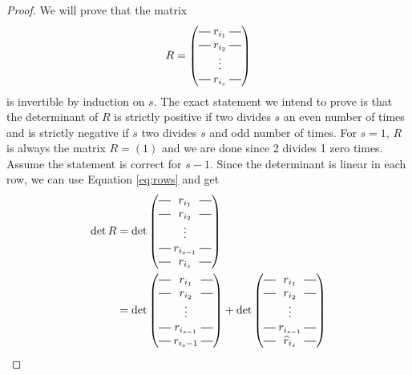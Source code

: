 \begin{proof}
  We will prove that the matrix
  \[ R = 
  \begin{pmatrix}
    \matrow{r_{i_1}} \\
    \matrow{r_{i_2}} \\
    & \hspace{-0.75em} \vdots & \\
    \matrow{r_{i_s}}
  \end{pmatrix}
  \]
  is invertible by induction on $s$. The exact statement we intend to
  prove is that the determinant of $R$ is strictly positive if two
  divides $s$ an even number of times and is strictly negative if $s$
  two divides $s$ and odd number of times.
  For $s = 1$, $R$ is always the matrix $R = \left( 1 \right)$ and we
  are done since 2 divides 1 zero times.
  Assume the statement is correct for $s-1$. Since the determinant is
  linear in each row, we can use Equation \ref{eq:rows} and get
  \begin{align*}
    \det{R} &= 
              \det\begin{pmatrix}
                \matrow{r_{i_1}} \\
                \matrow{r_{i_2}} \\
                & \hspace{-0.75em} \vdots & \\
                \matrow{r_{i_{s-1}}} \\
                \matrow{r_{i_s}}
              \end{pmatrix} \\
            &= 
              \det\begin{pmatrix}
                \matrow{r_{i_1}} \\
                \matrow{r_{i_2}} \\
                & \hspace{-0.75em} \vdots & \\
                \matrow{r_{i_{s-1}}} \\
                \matrow{r_{i_s-1}}
              \end{pmatrix}+
    \det\begin{pmatrix}
      \matrow{r_{i_1}} \\
      \matrow{r_{i_2}} \\
      & \hspace{-0.75em} \vdots & \\
      \matrow{r_{i_{s-1}}} \\
      \matrow{\widehat{r}_{i_s}}
    \end{pmatrix} \\

\end{align*}
\end{proof}
